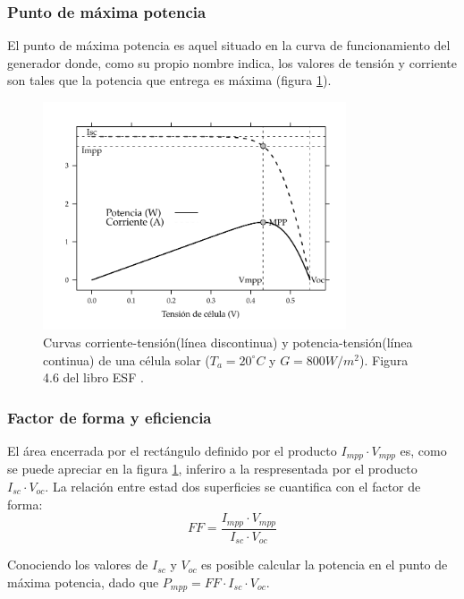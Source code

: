 \subsubsection{Punto de máxima potencia}
\label{sec:org7d65041}
El punto de máxima potencia es aquel situado en la curva de funcionamiento del generador donde, como su propio nombre indica, los valores de tensión y corriente son tales que la potencia que entrega es máxima (figura \ref{fig:orgb31a9d6}).
\begin{figure}[htbp]
\centering
\includegraphics[keepaspectratio,width=0.8\textwidth,height=0.5\textheight]{figuras/CurvaIV_Ta20_G800.pdf}
\caption{\label{fig:orgb31a9d6}Curvas corriente-tensión(línea discontinua) y potencia-tensión(línea continua) de una célula solar (\(T_a=20^\circ C\) y \(G=800 W/m^2\)). Figura 4.6 del libro ESF \cite{Perpinan2023}.}
\end{figure}

\subsubsection{Factor de forma y eficiencia}
\label{sec:org850b597}
El área encerrada por el rectángulo definido por el producto \(I_{mpp}\cdot V_{mpp}\) es, como se puede apreciar en la figura \ref{fig:orgb31a9d6}, inferiro a la respresentada por el producto \(I_{sc}\cdot V_{oc}\). La relación entre estad dos superficies se cuantifica con el factor de forma:
\begin{equation}
FF=\frac{I_{mpp}\cdot V_{mpp}}{I_{sc}\cdot V_{oc}}
\label{eq:factor-forma}
\end{equation}

Conociendo los valores de \(I_{sc}\) y \(V_{oc}\) es posible calcular la potencia en el punto de máxima potencia, dado que \(P_{mpp}=FF\cdot I_{sc}\cdot V_{oc}\).

